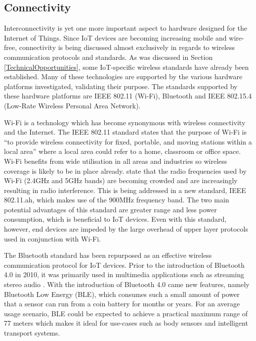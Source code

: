     \subsection{Connectivity}
    \label{section:connectivity}
      Interconnectivity is yet one more important aspect to hardware designed for the Internet of Things. Since IoT devices are becoming increasing mobile and wire-free, connectivity is being discussed almost exclusively in regards to wireless communication protocols and standards. As was discussed in Section \ref{TechnicalOpportunities}, some IoT-specific wireless standards have already been established. Many of these technologies are supported by the various hardware platforms investigated, validating their purpose. The standards supported by these hardware platforms are IEEE 802.11 (Wi-Fi), Bluetooth and IEEE 802.15.4 (Low-Rate Wireless Personal Area Network). 

      Wi-Fi is a technology which has become synonymous with wireless connectivity and the Internet. The IEEE 802.11 standard states that the purpose of Wi-Fi is ``to provide wireless connectivity for fixed, portable, and moving stations within a local area'' where a local area could refer to a home, classroom or office space. Wi-Fi benefits from wide utilisation in all areas and industries so wireless coverage is likely to be in place already. \citet{wifiah:2012} state that the radio frequencies used by Wi-Fi (2.4GHz and 5GHz bands) are becoming crowded and are increasingly resulting in radio interference. This is being addressed in a new standard, IEEE 802.11.ah, which makes use of the 900MHz frequency band. The two main potential advantages of this standard are greater range and less power consumption, which is beneficial to IoT devices. Even with this standard, however, end devices are impeded by the large overhead of upper layer protocols used in conjunction with Wi-Fi.

      The Bluetooth standard has been repurposed as an effective wireless communication protocol for IoT devices. Prior to the introduction of Bluetooth 4.0 in 2010, it was primarily used in multimedia applications such as streaming stereo audio \citep{bluetooth:2014}. With the introduction of Bluetooth 4.0 came new features, namely Bluetooth Low Energy (BLE), which consumes such a small amount of power that a sensor can run from a coin battery for months or years. For an average usage scenario, BLE could be expected to achieve a practical maximum range of 77 meters \citep{linklabs:2015} which makes it ideal for use-cases such as body sensors and intelligent transport systems.

